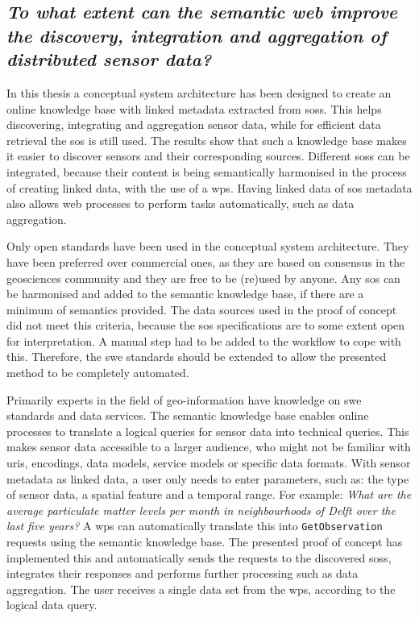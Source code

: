 \subsection*{\textit{To what extent can the semantic web improve the discovery, integration and aggregation of distributed sensor data?}}%


In this thesis a conceptual system architecture has been designed to create an online knowledge base with linked metadata extracted from \aclp{sos}. This helps discovering, integrating and aggregation sensor data, while for efficient data retrieval the \ac{sos} is still used. The results show that such a knowledge base makes it easier to discover sensors and their corresponding sources. Different \aclp{sos} can be integrated, because their content is being semantically harmonised in the process of creating linked data, with the use of a \ac{wps}. Having linked data of \ac{sos} metadata also allows web processes to perform tasks automatically, such as data aggregation.

Only open standards have been used in the conceptual system architecture. They have been preferred over commercial ones, as they are based on consensus in the geosciences community and they are free to be (re)used by anyone. Any \ac{sos} can be harmonised and added to the semantic knowledge base, if there are a minimum of semantics provided. The data sources used in the proof of concept did not meet this criteria, because the \ac{sos} specifications are to some extent open for interpretation. A manual step had to be added to the workflow to cope with this. Therefore, the \ac{swe} standards should be extended to allow the presented method to be completely automated. 

Primarily experts in the field of geo-information have knowledge on \ac{swe} standards and data services. The semantic knowledge base enables online processes to translate a logical queries for sensor data into technical queries. This makes sensor data accessible to a larger audience, who might not be familiar with \acp{uri}, encodings, data models, service models or specific data formats. With sensor metadata as linked data, a user only needs to enter parameters, such as: the type of sensor data, a spatial feature and a temporal range. For example: \textit{What are the average particulate matter levels per month in neighbourhoods of Delft over the last five years?} A \ac{wps} can automatically translate this into \texttt{GetObservation} requests using the semantic knowledge base. The presented proof of concept has implemented this and automatically sends the requests to the discovered \aclp{sos}, integrates their responses and performs further processing such as data aggregation. The user receives a single data set from the \ac{wps}, according to the logical data query.   

